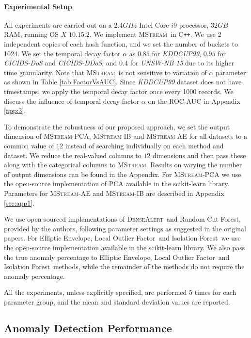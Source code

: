 \documentclass[sigconf]{acmart}
\newcommand{\method}{\textsc{MStream}}
\newcommand{\densealert}{\textsc{DenseAlert}}
\newcommand{\rcf}{Random Cut Forest}
\newcommand{\iso}{Isolation Forest}
\newcommand{\elliptic}{Elliptic Envelope}
\newcommand{\lof}{Local Outlier Factor}
\begin{document}
\paragraph{\bf Experimental Setup}
All experiments are carried out on a $2.4 GHz$ Intel Core $i9$ processor, $32 GB$ RAM, running OS $X$ $10.15.2$. We implement \method\ in C\texttt{++}. We use $2$ independent copies of each hash function, and we set the number of buckets to 1024. We set the temporal decay factor $\alpha$ as $0.85$ for \emph{KDDCUP99}, $0.95$ for \emph{CICIDS-DoS} and \emph{CICIDS-DDoS}, and $0.4$ for \emph{UNSW-NB 15} due to its higher time granularity. Note that \method\ is not sensitive to variation of $\alpha$ parameter as shown in Table \ref{tab:FactorVsAUC}. Since \emph{KDDCUP99} dataset does not have timestamps, we apply the temporal decay factor once every 1000 records. We discuss the influence of temporal decay factor $\alpha$ on the ROC-AUC in Appendix \ref{app:3}.

To demonstrate the robustness of our proposed approach, we set the output dimension of \method-PCA, \method-IB and \method-AE for all datasets to a common value of $12$ instead of searching individually on each method and dataset. We reduce the real-valued columns to $12$ dimensions and then pass these along with the categorical columns to \method. Results on varying the number of output dimensions can be found in the Appendix. For \method-PCA we use the open-source implementation of PCA available in the scikit-learn \cite{scikit-learn} library. Parameters for \method-AE and \method-IB are described in Appendix \ref{sec:app1}.

We use open-sourced implementations of \densealert\ and \rcf, provided by the authors, following parameter settings as suggested in the original papers. For \elliptic, \lof\ and \iso\ we use the open-source implementation available in the scikit-learn \cite{scikit-learn} library. We also pass the true anomaly percentage to \elliptic, \lof\ and \iso\ methods, while the remainder of the methods do not require the anomaly percentage.

All the experiments, unless explicitly specified, are performed $5$ times for each parameter group, and the mean and standard deviation values are reported.



\subsection{Anomaly Detection Performance}
\end{document}
